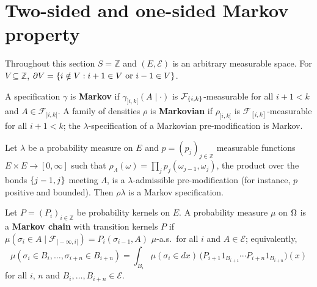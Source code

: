 \section{Two-sided and one-sided Markov property}

Throughout this section $S = \mathbb{Z}$ and $(E, \mathcal E)$ is an arbitrary measurable space.
For $V \subseteq \mathbb Z$, $\partial V = \left\{ i \notin V : i + 1 \in V \text{ or } i - 1 \in V \right\}$.

\begin{definition}
    \label{def:mfi-markov-spec}
    \leanok

    A specification $\gamma$ is \textbf{Markov} if $\gamma_{]i,k[}(A \mid \cdot)$ is
    $\mathcal F_{\left\{ i,k \right\}}$-measurable for all $i + 1 < k$ and $A \in \mathcal F_{]i,k[}$. A
    family of densities $\rho$ is \textbf{Markovian} if $\rho_{]i,k[}$ is
    $\mathcal F_{[i,k]}$-measurable for all $i + 1 < k$; the $\lambda$-specification of a
    Markovian pre-modification is Markov.
\end{definition}

\begin{example}[Georgii (10.3)]
    \label{ex:mfi-10-3}
    \leanok

    Let $\lambda$ be a probability measure on $E$ and $p = (p_j)_{j \in \mathbb Z}$ measurable
    functions $E \times E \to [0,\infty]$ such that
    $\rho_\Lambda(\omega) = \prod_{j} p_j(\omega_{j-1}, \omega_j)$, the product over the bonds
    $\left\{ j-1, j \right\}$ meeting $\Lambda$, is a $\lambda$-admissible pre-modification (for instance,
    $p$ positive and bounded). Then $\rho\lambda$ is a Markov specification.
\end{example}

\begin{definition}
    \label{def:mfi-markov-chain}
    \leanok

    Let $P = (P_i)_{i \in \mathbb Z}$ be probability kernels on $E$. A probability measure $\mu$
    on $\Omega$ is a \textbf{Markov chain} with transition kernels $P$ if
    $\mu(\sigma_i \in A \mid \mathcal F_{]-\infty, i[}) = P_i(\sigma_{i-1}, A)$ $\mu$-a.s.\ for
    all $i$ and $A \in \mathcal E$; equivalently,
    \[
        \mu(\sigma_i \in B_i, \dots, \sigma_{i+n} \in B_{i+n})
        = \int_{B_i} \mu(\sigma_i \in dx)\, \bigl(P_{i+1} 1_{B_{i+1}} \cdots P_{i+n} 1_{B_{i+n}}\bigr)(x)
        \tag{10.5}
    \]
    for all $i$, $n$ and $B_i, \dots, B_{i+n} \in \mathcal E$.
\end{definition}

